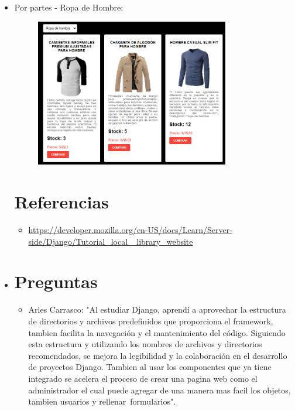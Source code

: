 \documentclass{article}
\begin{document}
\begin{itemize}
\item Por partes - Ropa de Hombre:
\begin{figure}[H]
		\centering
		\includegraphics[width=0.8\textwidth,keepaspectratio]{Latex/img/ropahombre.png}
	\end{figure}


\section{Referencias}
\begin{itemize}			
	\item \url{https://developer.mozilla.org/en-US/docs/Learn/Server-side/Django/Tutorial_local_
library_website}
\end{itemize}	
	
 \item 
	\section{Preguntas}
	\begin{itemize}
 \item Arles Carrasco: "Al estudiar Django, aprendí a aprovechar la estructura de directorios y archivos predefinidos que proporciona el framework, tambien facilita la navegación y el mantenimiento del código. Siguiendo esta estructura y utilizando los nombres de archivos y directorios recomendados, se mejora la legibilidad y la colaboración en el desarrollo de proyectos Django. Tambien al usar los componentes que ya tiene integrado se acelera el proceso de crear una pagina web como el administrador el cual puede agregar de una manera mas facil los objetos, tambien usuarios y rellenar formularios".


\end{itemize}
\end{itemize}
\end{document}
